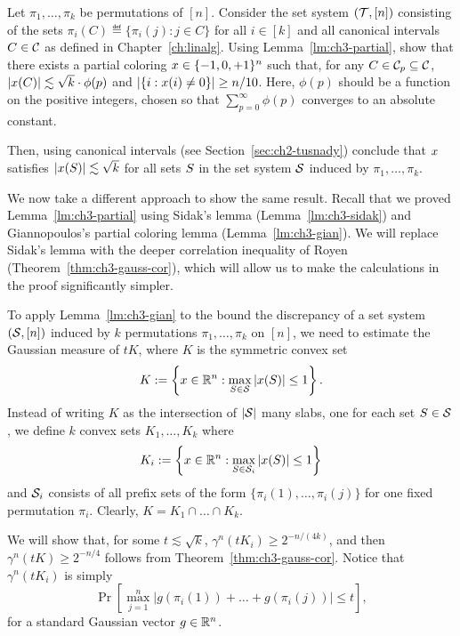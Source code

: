 \begin{exercise}\label{ex:ch3-kperms}
  Let \(\pi_1, \ldots, \pi_k\) be permutations of \([n]\). Consider
  the set system \((\mathcal{T},[n])\) consisting of the sets \(\pi_i(C)
  \eqdef \{\pi_i(j): j \in C\}\) for
  all \(i \in [k]\) and all canonical intervals \(C \in \mathcal{C}\) as
  defined in Chapter~\ref{ch:linalg}. Using Lemma~\ref{lm:ch3-partial},
  show that there exists a partial coloring \(x\in \{-1, 0,+1\}^n\)
  such that, for any \(C \in \mathcal{C}_p \subseteq \mathcal{C}\), \(|x(C)| \lesssim
  \sqrt{k}\cdot\phi(p)\) and \(|\{i: x(i) \neq 0\}| \ge
  n/10\). Here, \(\phi(p)\) should be a function on the
  positive integers, chosen so that \(\sum_{p = 0}^{\infty}\phi(p)\)
  converges to an absolute constant.

  Then, using canonical intervals (see Section~\ref{sec:ch2-tusnady}) conclude that \(x\)
  satisfies \(|x(S)|\lesssim \sqrt{k}\) for all sets \(S\) in
  the set system \(\mathcal{S}\) induced by \(\pi_1, \ldots, \pi_k\).
\end{exercise}
We now take a different approach to show the same
result. Recall that we proved Lemma~\ref{lm:ch3-partial} using Sidak's
lemma (Lemma~\ref{lm:ch3-sidak}) and Giannopoulos's partial coloring
lemma (Lemma~\ref{lm:ch3-gian}). We will replace Sidak's lemma with
the deeper correlation inequality of Royen
(Theorem~\ref{thm:ch3-gauss-cor}), which will allow us to make the
calculations in the proof significantly simpler.

To apply Lemma~\ref{lm:ch3-gian} to the 
bound the discrepancy of a set system \((\mathcal{S},[n])\) induced by
\(k\) permutations \(\pi_1, \ldots, \pi_k\) on \([n]\), we need to
estimate the Gaussian measure of $tK$, where $K$ is the symmetric convex set
\begin{equation}\label{eq:ch3-K-perms}
K :=\left\{x \in \mathbb{R}^n: \max_{S \in \mathcal{S}} |x(S)| \le 1\right\}.
\end{equation}
Instead of writing \(K\) as the
intersection of \(|\mathcal{S}|\) many slabs, one for each set \(S \in
\mathcal{S}\), we define \(k\) convex sets \(K_1, \ldots, K_k\) where
\begin{equation}\label{eq:ch3-Ki}
K_i :=\left\{x \in \mathbb{R}^n: \max_{S \in \mathcal{S}_i} |x(S)| \le 1\right\}
\end{equation}
and \(\mathcal{S}_i\) consists of all prefix sets of the form \(\{\pi_i(1),
\ldots, \pi_i(j)\}\) for one fixed permutation \(\pi_i\). Clearly, \(K
= K_1 \cap \ldots \cap K_k\). 

We will show that, for some \(t \lesssim
\sqrt{k}\), \(\gamma^n(tK_i) \ge 2^{-n/(4k)}\), and then \(\gamma^n(tK) \ge
2^{-n/4}\) follows from Theorem~\ref{thm:ch3-gauss-cor}.
Notice that $\gamma^n(tK_i)$ is simply
\[
  \Pr[\max_{j = 1}^n\left|g(\pi_i(1)) + \ldots +
    g(\pi_i(j))\right| \le t],
\]
for a standard Gaussian
 vector \(g \in \mathbb{R}^n\). 
 
